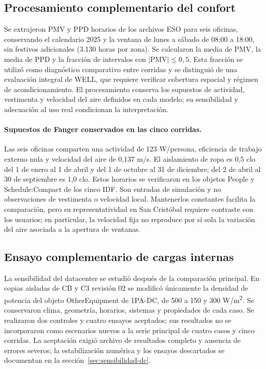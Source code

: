 \subsection{Procesamiento complementario del confort}
Se extrajeron PMV y PPD horarios de los archivos ESO para seis oficinas, conservando el calendario 2025 y la ventana de lunes a sábado de 08:00 a 18:00, sin festivos adicionales (3.130 horas por zona). Se calcularon la media de PMV, la media de PPD y la fracción de intervalos con $|\mathrm{PMV}|\leq0,5$. Esta fracción se utilizó como diagnóstico comparativo entre corridas y se distinguió de una evaluación integral de WELL, que requiere verificar cobertura espacial y régimen de acondicionamiento. El procesamiento conserva los supuestos de actividad, vestimenta y velocidad del aire definidos en cada modelo; su sensibilidad y adecuación al uso real condicionan la interpretación.


\paragraph{Supuestos de Fanger conservados en las cinco corridas.}
Las seis oficinas comparten una actividad de 123 W/persona, eficiencia de trabajo externo nula y velocidad del aire de 0,137 m/s. El aislamiento de ropa es 0,5 clo del 1 de enero al 1 de abril y del 1 de octubre al 31 de diciembre; del 2 de abril al 30 de septiembre es 1,0 clo. Estos horarios se verificaron en los objetos People y Schedule:Compact de los cinco IDF. Son entradas de simulación y no observaciones de vestimenta o velocidad local. Mantenerlos constantes facilita la comparación, pero su representatividad en San Cristóbal requiere contraste con los usuarios; en particular, la velocidad fija no reproduce por sí sola la variación del aire asociada a la apertura de ventanas.


\subsection{Ensayo complementario de cargas internas}
La sensibilidad del datacenter se estudió después de la comparación principal. En copias aisladas de CB y C3 revisión 02 se modificó únicamente la densidad de potencia del objeto OtherEquipment de 1PA-DC, de 500 a 150 y 300 W/m\textsuperscript{2}. Se conservaron clima, geometría, horarios, sistemas y propiedades de cada caso. Se realizaron dos controles y cuatro ensayos aceptados; sus resultados no se incorporaron como escenarios nuevos a la serie principal de cuatro casos y cinco corridas. La aceptación exigió archivo de resultados completo y ausencia de errores severos; la estabilización numérica y los ensayos descartados se documentan en la sección~\ref{sec:sensibilidad-dc}.
